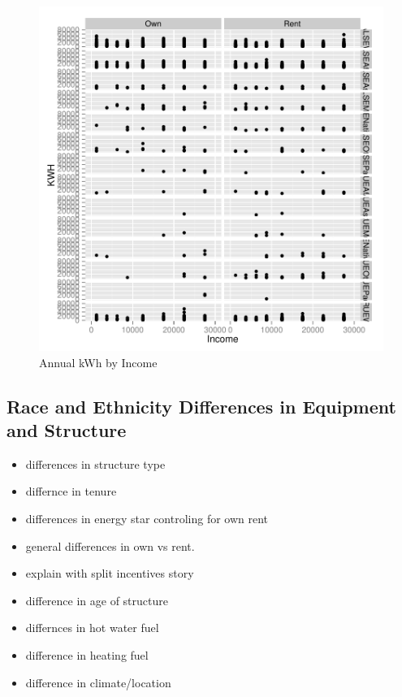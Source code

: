 \documentclass{article}
\begin{document}
\begin{figure}
\begin{center}
\caption{Annual kWh by Income}
\label{fig:kWhbyIncome}
\includegraphics{DraftEdwardsWoods-005}
\end{center}
\end{figure}



  \subsection{Race and Ethnicity Differences in Equipment and Structure}

\begin{itemize}
  \item differences in structure type
  \item differnce in tenure
  \item differences in energy star controling for own rent
  \item general differences in own vs rent.  
  \item explain with split incentives story
  \item difference in age of structure
  \item differnces in hot water fuel
  \item difference in heating fuel
    \item difference in climate/location
\end{itemize}
  
\end{document}
